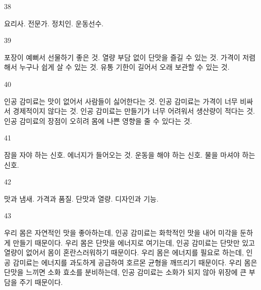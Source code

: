 \documentclass[fs9,seriesFre]{korfarm-base}
\begin{document}
\begin{kfSentenceUnit}{38}{}
\begin{kfChoices}
\kfChoice 요리사.
\kfChoice 전문가.
\kfChoice 정치인.
\kfChoice 운동선수.
\end{kfChoices}
\end{kfSentenceUnit}

\begin{kfSentenceUnit}{39}{}
\begin{kfChoices}
\kfChoice 포장이 예뻐서 선물하기 좋은 것.
\kfChoice 열량 부담 없이 단맛을 즐길 수 있는 것.
\kfChoice 가격이 저렴해서 누구나 쉽게 살 수 있는 것.
\kfChoice 유통 기한이 길어서 오래 보관할 수 있는 것.
\end{kfChoices}
\end{kfSentenceUnit}

\begin{kfSentenceUnit}{40}{}
\begin{kfChoices}
\kfChoice 인공 감미료는 맛이 없어서 사람들이 싫어한다는 것.
\kfChoice 인공 감미료는 가격이 너무 비싸서 경제적이지 않다는 것.
\kfChoice 인공 감미료는 만들기가 너무 어려워서 생산량이 적다는 것.
\kfChoice 인공 감미료의 장점이 오히려 몸에 나쁜 영향을 줄 수 있다는 것.
\end{kfChoices}
\end{kfSentenceUnit}

\begin{kfSentenceUnit}{41}{}
\begin{kfChoices}
\kfChoice 잠을 자야 하는 신호.
\kfChoice 에너지가 들어오는 것.
\kfChoice 운동을 해야 하는 신호.
\kfChoice 물을 마셔야 하는 신호.
\end{kfChoices}
\end{kfSentenceUnit}

\begin{kfSentenceUnit}{42}{}
\begin{kfChoices}
\kfChoice 맛과 냄새.
\kfChoice 가격과 품질.
\kfChoice 단맛과 열량.
\kfChoice 디자인과 기능.
\end{kfChoices}
\end{kfSentenceUnit}

\begin{kfSentenceUnit}{43}{}
\begin{kfChoices}
\kfChoice 우리 몸은 자연적인 맛을 좋아하는데, 인공 감미료는 화학적인 맛을 내어 미각을 둔하게 만들기 때문이다.
\kfChoice 우리 몸은 단맛을 에너지로 여기는데, 인공 감미료는 단맛만 있고 열량이 없어서 몸이 혼란스러워하기 때문이다.
\kfChoice 우리 몸은 에너지를 필요로 하는데, 인공 감미료는 에너지를 과도하게 공급하여 호르몬 균형을 깨뜨리기 때문이다.
\kfChoice 우리 몸은 단맛을 느끼면 소화 효소를 분비하는데, 인공 감미료는 소화가 되지 않아 위장에 큰 부담을 주기 때문이다.
\end{kfChoices}
\end{kfSentenceUnit}
\end{document}
